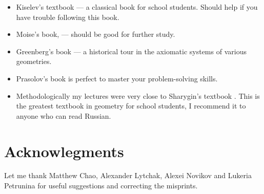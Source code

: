 \begin{itemize}
\item Kiselev's textbook \cite{kiselev} ---
a classical book for school students.
Should help if you have trouble following this book.

\item Moise's book, \cite{moise} ---
should be good for further study.

\item Greenberg's book \cite{greenberg}  --- a historical tour in the axiomatic systems of various geometries.

\item Prasolov's book \cite{prasolov} is perfect to master your problem-solving skills. 

\item Methodologically my lectures
were very close to Sharygin's  textbook \cite{sharygin}.
This is the greatest textbook in geometry for school students,
I recommend it to anyone who can read Russian.


\end{itemize}

\section*{Acknowlegments}
Let me thank  
Matthew Chao, 
Alexander Lytchak,
Alexei Novi\-kov
and Lukeria Petrunina
for useful suggestions and correcting the misprints.





